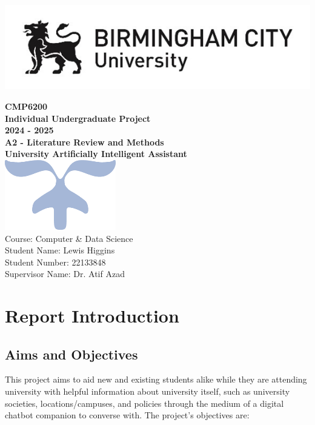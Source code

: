 \documentclass[12pt]{report}
\begin{document}
    \makeatletter
    \begin{titlepage}
        \includegraphics[width=0.3\linewidth]{BCUWide.jpg}\\[4ex]
        \vspace{1cm}
        \begin{center}
            {\huge \bfseries  CMP6200}\\[2ex]
            {\huge \bfseries  Individual Undergraduate Project}\\[2ex]
            {\huge \bfseries 2024 - 2025}\\[6ex]
            {\large \bfseries A2 - Literature Review and Methods}\\[10ex]
            {\huge \bfseries University Artificially Intelligent Assistant}\\[6ex]
            \includegraphics[width=0.1\linewidth]{Symbol.png}\\[40ex]
            Course: Computer \& Data Science\\
            Student Name: Lewis Higgins\\
            Student Number: 22133848\\
            Supervisor Name: Dr. Atif Azad
        \end{center}
    \end{titlepage}
    \makeatother
    \thispagestyle{empty}
    \newpage

    \tableofcontents

    \chapter{Report Introduction}\label{ch:introduction}
    \section{Aims and Objectives}

    \noindent
    This project aims to aid new and existing students alike while they are attending university with 
    helpful information about university itself, such as university societies, locations/campuses, 
    and policies through the medium of a digital chatbot companion to converse with.
    The project's objectives are:
\end{document}
